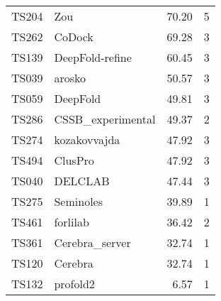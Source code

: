 \begin{table}[ht]
{\begin{tabular}{llrr}
TS204 & Zou & 70.20 & 5 \\ 
TS262 & CoDock & 69.28 & 3 \\ 
TS139 & DeepFold-refine & 60.45 & 3 \\ 
TS039 & arosko & 50.57 & 3 \\ 
TS059 & DeepFold & 49.81 & 3 \\ 
TS286 & CSSB\_experimental & 49.37 & 2 \\ 
TS274 & kozakovvajda & 47.92 & 3 \\ 
TS494 & ClusPro & 47.92 & 3 \\ 
TS040 & DELCLAB & 47.44 & 3 \\ 
TS275 & Seminoles & 39.89 & 1 \\ 
TS461 & forlilab & 36.42 & 2 \\ 
TS361 & Cerebra\_server & 32.74 & 1 \\ 
TS120 & Cerebra & 32.74 & 1 \\ 
TS132 & profold2 & 6.57 & 1 \\ 
\bottomrule
\end{tabular}%
}
\end{table}
